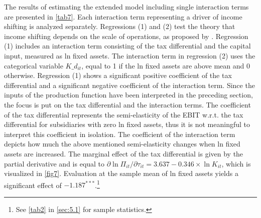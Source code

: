 \documentclass[10pt,twocolumn,oneside,cmyk]{article}
\begin{document}
The results of estimating the extended model including single interaction terms are presented in \cref{tab7}. Each interaction term representing a driver of income shifting is analyzed separately. Regressions (1) and (2) test the theory that income shifting depends on the scale of operations, as proposed by \textcite{huizinga_international_2008}. Regression (1) includes an interaction term consisting of the tax differential and the capital input, measured as ln fixed assets. The interaction term in regression (2) uses the categorical variable $K\_d_{it}$, equal to 1 if the ln fixed assets are above mean and 0 otherwise. Regression (1) shows a significant positive coefficient of the tax differential and a significant negative coefficient of the interaction term. Since the inputs of the production function have been interpreted in the preceding section, the focus is put on the tax differential and the interaction terms. The coefficient of the tax differential represents the semi-elasticity of the EBIT w.r.t. the tax differential for subsidiaries with zero ln fixed assets, thus it is not meaningful to interpret this coefficient in isolation. The coefficient of the interaction term depicts how much the above mentioned semi-elasticity changes when ln fixed assets are increased. The marginal effect of the tax differential is given by the partial derivative and is equal to $\partial \ln \Pi_{it} / \partial \tau_{it}=3.637-0.346\times \ln K_{it}$, which is visualized in \cref{fig7}. Evaluation at the sample mean of ln fixed assets yields a significant effect of $-1.187^{***}$.\footnote{See \cref{tab2} in \cref{sec:5.1} for sample statistics.}
\end{document}
